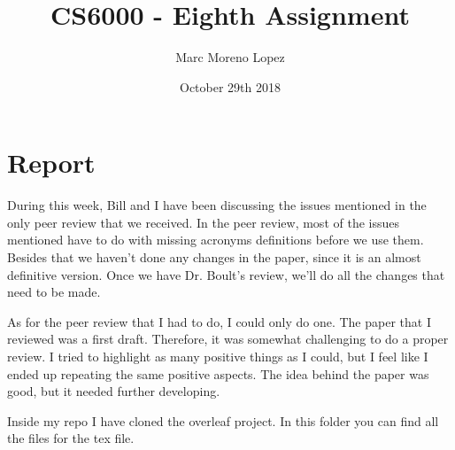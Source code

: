 \documentclass{article}
\title{CS6000 - Eighth Assignment}
\author{Marc Moreno Lopez}
\date{October 29th 2018}
\begin{document}
\maketitle

\section{Report}


During this week, Bill and I have been discussing the issues mentioned in the only peer review that we received. In the peer review, most of the issues mentioned have to do with missing acronyms definitions before we use them. 
Besides that we haven't done any changes in the paper, since it is an almost definitive version. Once we have Dr. Boult's review, we'll do all the changes that need to be made. 

As for the peer review that I had to do, I could only do one. The paper that I reviewed was a first draft. Therefore, it was somewhat challenging to do a proper review. I tried to highlight as many positive things as I could, but I feel like I ended up repeating the same positive aspects. The idea behind the paper was good, but it needed further developing. 

Inside my repo I have cloned the overleaf project. In this folder you can find all the files for the tex file.
\end{document}
